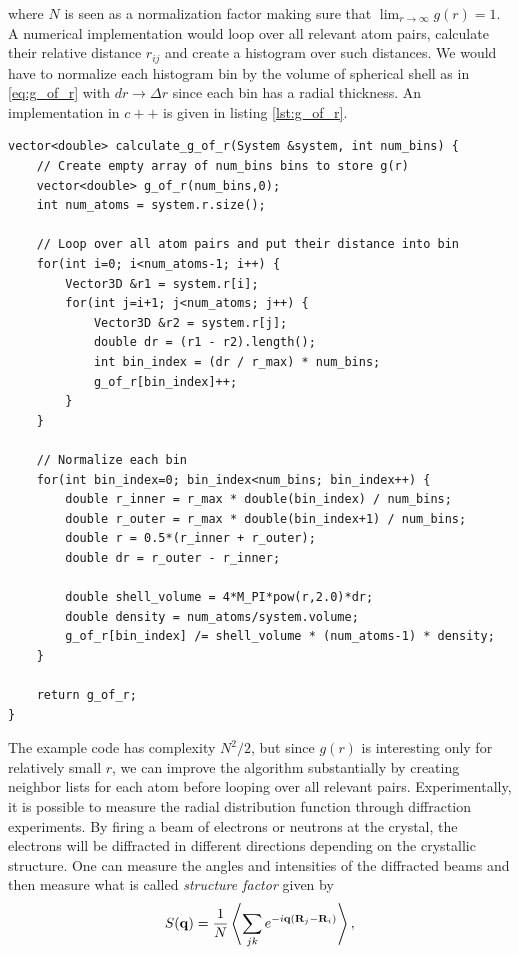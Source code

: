 where $N$ is seen as a normalization factor making sure that $\lim_{r\rightarrow \infty} g(r) = 1$. A numerical implementation would loop over all relevant atom pairs, calculate their relative distance $r_{ij}$ and create a histogram over such distances. We would have to normalize each histogram bin by the volume of spherical shell as in \eqref{eq:g_of_r} with $dr\rightarrow \Delta r$ since each bin has a radial thickness. An implementation in $c++$ is given in  listing \ref{lst:g_of_r}.

\begin{lstlisting}[caption=Calculation of $g(r)$., label=lst:g_of_r]
vector<double> calculate_g_of_r(System &system, int num_bins) {
    // Create empty array of num_bins bins to store g(r)
    vector<double> g_of_r(num_bins,0);
    int num_atoms = system.r.size();

    // Loop over all atom pairs and put their distance into bin
    for(int i=0; i<num_atoms-1; i++) {
        Vector3D &r1 = system.r[i];
        for(int j=i+1; j<num_atoms; j++) {
            Vector3D &r2 = system.r[j];
            double dr = (r1 - r2).length();
            int bin_index = (dr / r_max) * num_bins;
            g_of_r[bin_index]++;
        }
    }

    // Normalize each bin
    for(int bin_index=0; bin_index<num_bins; bin_index++) {
        double r_inner = r_max * double(bin_index) / num_bins;
        double r_outer = r_max * double(bin_index+1) / num_bins;
        double r = 0.5*(r_inner + r_outer);
        double dr = r_outer - r_inner;

        double shell_volume = 4*M_PI*pow(r,2.0)*dr;
        double density = num_atoms/system.volume;
        g_of_r[bin_index] /= shell_volume * (num_atoms-1) * density;
    }

    return g_of_r;
}
\end{lstlisting}
The example code has complexity $N^2/2$, but since $g(r)$ is interesting only for relatively small $r$, we can improve the algorithm substantially by creating neighbor lists for each atom before looping over all relevant pairs. Experimentally, it is possible to measure the radial distribution function through diffraction experiments. By firing a beam of electrons or neutrons at the crystal, the electrons will be diffracted in different directions depending on the crystallic structure. One can measure the angles and intensities of the diffracted beams and then measure what is called \textit{structure factor} given by
\begin{align}
    S(\vec q) = {1\over N}\left\langle \sum_{jk} e^{-i\vec q(\vec R_j - \vec R_i)}\right \rangle,
\end{align}
